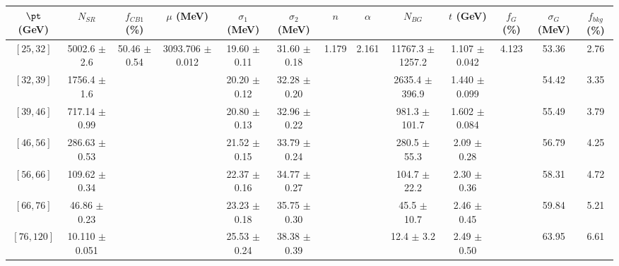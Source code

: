 \begin{tabular}{c||c|c|c|c|c|c|c|c|c|c|c||c}
$\pt$ (GeV) & $N_{SR}$ & $f_{CB1}$ (\%) & $\mu$ (MeV) & $\sigma_1$ (MeV) & $\sigma_2$ (MeV) & $n$ & $\alpha$ & $N_{BG}$ & $t$ (GeV) & $f_G$ (\%) & $\sigma_G$ (MeV) & $f_{bkg}$ (\%) \\
\hline
$[25, 32]$ & 5002.6 $\pm$ 2.6 & \multirow{7}{*}{50.46 $\pm$ 0.54} & \multirow{7}{*}{3093.706 $\pm$ 0.012} & 19.60 $\pm$ 0.11 & 31.60 $\pm$ 0.18 & \multirow{7}{*}{1.179} & \multirow{7}{*}{2.161} & 11767.3 $\pm$ 1257.2 & 1.107 $\pm$ 0.042 & \multirow{7}{*}{4.123} & 53.36 & 2.76\\
$[32, 39]$ & 1756.4 $\pm$ 1.6 &  &  & 20.20 $\pm$ 0.12 & 32.28 $\pm$ 0.20 &  &  & 2635.4 $\pm$ 396.9 & 1.440 $\pm$ 0.099 &  & 54.42 & 3.35\\
$[39, 46]$ & 717.14 $\pm$ 0.99 &  &  & 20.80 $\pm$ 0.13 & 32.96 $\pm$ 0.22 &  &  & 981.3 $\pm$ 101.7 & 1.602 $\pm$ 0.084 &  & 55.49 & 3.79\\
$[46, 56]$ & 286.63 $\pm$ 0.53 &  &  & 21.52 $\pm$ 0.15 & 33.79 $\pm$ 0.24 &  &  & 280.5 $\pm$ 55.3 & 2.09 $\pm$ 0.28 &  & 56.79 & 4.25\\
$[56, 66]$ & 109.62 $\pm$ 0.34 &  &  & 22.37 $\pm$ 0.16 & 34.77 $\pm$ 0.27 &  &  & 104.7 $\pm$ 22.2 & 2.30 $\pm$ 0.36 &  & 58.31 & 4.72\\
$[66, 76]$ & 46.86 $\pm$ 0.23 &  &  & 23.23 $\pm$ 0.18 & 35.75 $\pm$ 0.30 &  &  & 45.5 $\pm$ 10.7 & 2.46 $\pm$ 0.45 &  & 59.84 & 5.21\\
$[76, 120]$ & 10.110 $\pm$ 0.051 &  &  & 25.53 $\pm$ 0.24 & 38.38 $\pm$ 0.39 &  &  & 12.4 $\pm$ 3.2 & 2.49 $\pm$ 0.50 &  & 63.95 & 6.61\\
\end{tabular}

